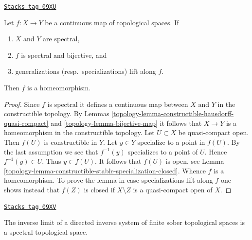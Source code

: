 \begin{lemma}
\label{topology-lemma-spectral-bijective}
\href{https://stacks.math.columbia.edu/tag/09XU}{\texttt{Stacks tag 09XU}}

Let $f : X \to Y$ be a continuous map of topological spaces. If
\begin{enumerate}
\item $X$ and $Y$ are spectral,
\item $f$ is spectral and bijective, and
\item generalizations (resp.\ specializations) lift along $f$.
\end{enumerate}
Then $f$ is a homeomorphism.
\end{lemma}

\begin{proof}

Since $f$ is spectral it defines a continuous map between $X$ and $Y$ in
the constructible topology. By
Lemmas \ref{topology-lemma-constructible-hausdorff-quasi-compact} and
\ref{topology-lemma-bijective-map}
it follows that $X \to Y$ is a homeomorphism in the constructible
topology. Let $U \subset X$ be quasi-compact open.
Then $f(U)$ is constructible in $Y$. Let $y \in Y$ specialize
to a point in $f(U)$. By the last assumption we see that $f^{-1}(y)$
specializes to a point of $U$. Hence $f^{-1}(y) \in U$. Thus $y \in f(U)$.
It follows that $f(U)$ is open, see
Lemma \ref{topology-lemma-constructible-stable-specialization-closed}.
Whence $f$ is a homeomorphism.
To prove the lemma in case specializations lift along $f$
one shows instead that $f(Z)$ is closed if $X \setminus Z$ is a
quasi-compact open of $X$.
\end{proof}

\begin{lemma}
\label{topology-lemma-directed-inverse-limit-finite-sober-spectral-spaces}
\href{https://stacks.math.columbia.edu/tag/09XV}{\texttt{Stacks tag 09XV}}

The inverse limit of a directed inverse system of finite sober
topological spaces is a spectral topological space.
\end{lemma}

